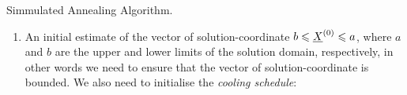 \begin{algorithm}[h]
{{{{                     
%
                 } %
             } %
%
%
         } %
%
     } %
 \caption{Simmulated Annealing Algorithm.}\label{Chapter:GlobalOpt:Algorithm:SAA}
\end{algorithm}
\begin{enumerate}[{\bf Step 1: }]
   \item An initial estimate of the vector of solution-coordinate $b\le\mfr[\underline{X}]{}{0}\le a$, where $a$ and $b$ are the upper and lower limits of the solution domain, respectively, in other words we need to ensure that the vector of solution-coordinate is bounded. We also need to initialise the {\it cooling schedule}:
\end{enumerate}

